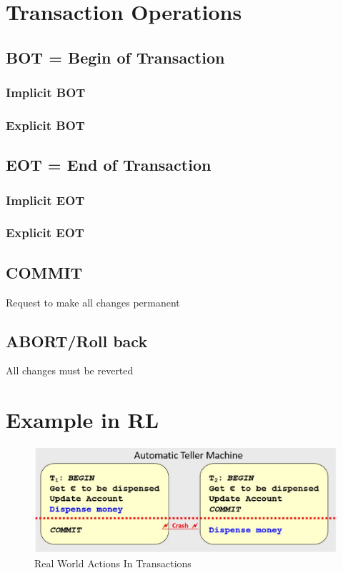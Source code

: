 	\section{Transaction Operations}
	
		\subsection{BOT = Begin of Transaction}
		
			\subsubsection{Implicit BOT}
				
			\subsubsection{Explicit BOT}
		
		\subsection{EOT = End of Transaction}
		
			\subsubsection{Implicit EOT}
		
			\subsubsection{Explicit EOT}
		
		\subsection{COMMIT}
			Request to make all changes permanent
		
		\subsection{ABORT/Roll back}
			All changes must be reverted
		
	\section{Example in RL}
		\begin{figure}[h!]
			\includegraphics[scale=0.5]{res/real-life-transaction.jpg}
			\caption{Real World Actions In Transactions}
		\end{figure}
	
